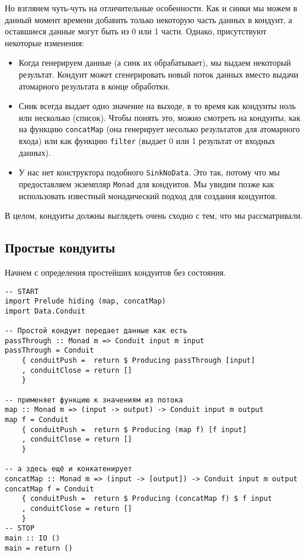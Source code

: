 Но взглянем чуть-чуть на отличительные особенности. Как и синки мы можем
в данный момент времени добавить только некоторую часть данных в кондуит, а оставшиеся 
данные могут быть из 0 или 1 части. Однако, присутствуют некоторые изменения:
\begin{itemize}  
\item Когда генерируем данные (а синк их обрабатывает), мы выдаем некоторый
результат. Кондуит может сгенерировать новый поток данных
вместо выдачи атомарного результата в конце обработки.
\item Синк всегда выдает одно значение на выходе, в то время как кондуиты ноль или 
несколько (список). Чтобы понять это, можно смотреть на кондуиты, как на функцию
\lstinline'concatMap' (она генерирует несолько результатов для атомарного входа)
или как функцию \lstinline'filter' (выдает 0 или 1 результат от входных данных).
\item У нас нет конструктора подобного \lstinline'SinkNoData'. Это так, потому что мы
предоставляем
экземпляр \lstinline'Monad' для кондуитов. Мы увидим позже как использовать известный 
монадический подход для создания кондуитов.
\end{itemize}  
В целом, кондуиты должны выглядеть очень сходно с тем, что мы рассматривали.

\subsection{Простые кондуиты}

Начнем с определения простейших кондуитов без состояния.
\begin{lstlisting}
-- START
import Prelude hiding (map, concatMap)
import Data.Conduit

-- Простой кондуит передает данные как есть
passThrough :: Monad m => Conduit input m input
passThrough = Conduit
    { conduitPush =  return $ Producing passThrough [input]
    , conduitClose = return []
    }

-- применяет функцию к значениям из потока
map :: Monad m => (input -> output) -> Conduit input m output
map f = Conduit
    { conduitPush =  return $ Producing (map f) [f input]
    , conduitClose = return []
    }

-- а здесь ещё и конкатенирует
concatMap :: Monad m => (input -> [output]) -> Conduit input m output
concatMap f = Conduit
    { conduitPush =  return $ Producing (concatMap f) $ f input
    , conduitClose = return []
    }
-- STOP
main :: IO ()
main = return ()
\end{lstlisting}

